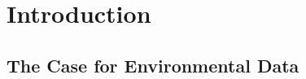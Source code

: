 \chapter{Introduction}
\label{ch:introduction}







% 

\section{The Case for Environmental Data} %

